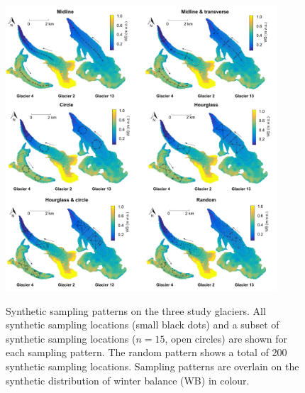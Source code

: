 \documentclass[twocolumn,letterpaper]{igs}
\begin{document}

\begin{figure}
	\centering
	\includegraphics[width =0.9\textwidth]{SamplingDesignAll.pdf}\\
	\caption{Synthetic sampling patterns on the three study glaciers. All synthetic sampling locations (small black dots) and a subset of synthetic sampling locations ($n=15$, open circles) are shown for each sampling pattern. The random pattern shows a total of 200 synthetic sampling locations. Sampling patterns are overlain on the synthetic distribution of winter balance (WB) in colour. } 
       \label{fig:SyntheticSampleDesign}
\end{figure}
\end{document}
